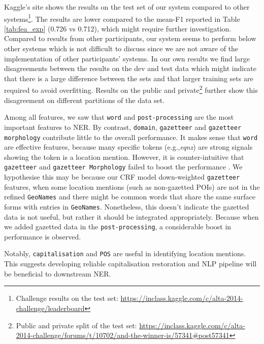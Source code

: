 \documentclass[11pt]{article}
\newcommand{\eg}{e.g.,\xspace}
\newcommand{\geoname}{\texttt{GeoNames}\xspace}
\newcommand{\myex}[1]{\textit{#1}}
\newcommand{\feature}[1]{\texttt{#1}\xspace}
\newcommand{\myurl}[1]{{\footnotesize\url{#1}}}
\newcommand{\tabref}[2][]{Table#1 \ref{#2}}
\begin{document}
Kaggle's site shows the results on the test set of our system compared to other systems\footnote{Challenge results on the test set: \myurl{https://inclass.kaggle.com/c/alta-2014-challenge/leaderboard}}.
The results are lower compared to the mean-F1 reported in \tabref{tab:fea_exp} (0.726 vs 0.712), which might require further investigation.
Compared to results from other participants, our system seems to perform below other systems which is not difficult to discuss since we are not aware of the implementation of other participants' systems.
In our own results we find large disagreements between the results on the dev and test data which might indicate that there is a large difference between the sets and that larger training sets are required to avoid overfitting.
Results on the public and private\footnote{Public and private split of the test set: \myurl{https://inclass.kaggle.com/c/alta-2014-challenge/forums/t/10702/and-the-winner-is/57341#post57341}} further show this disagreement on different partitions of the data set.

Among all features, we saw that \feature{word} and \feature{post-processing} are the most important features to NER.
By contrast, \feature{domain}, \feature{gazetteer} and \feature{gazetteer morphology} contribute little to the overall performance.
It makes sense that \feature{word} are effective features, because many specific tokens (\eg \myex{eqnz}) are strong signals showing the token is a location mention.
However, it is counter-intuitive that \feature{gazetteer} and \feature{gazetteer Morphology} failed to boost the performance \cite{conll09rati,acl11liux}.
We hypothesise this may be because our CRF model down-weighted \feature{gazetteer} features, when some location mentions (such as non-gazetted POIs) are not in the refined \geoname and there might be common words that share the same surface forms with entries in \geoname.
Nonetheless, this doesn't indicate the gazetted data is not useful, but rather it should be integrated appropriately.
Because when we added gazetted data in the \feature{post-processing}, a considerable boost in performance is observed.

Notably, \feature{capitalisation} and \feature{POS} are useful in identifying location mentions.
This suggests developing reliable capitalisation restoration and NLP pipeline will be beneficial to downstream NER.
\end{document}
